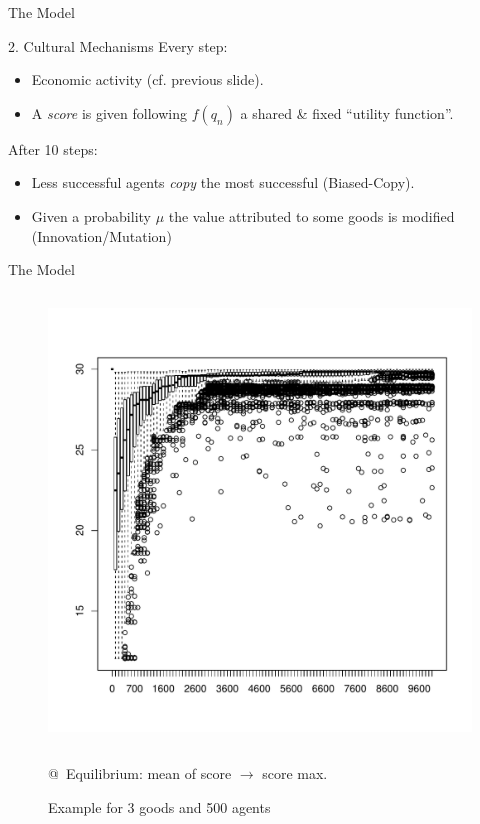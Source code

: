 \documentclass[12pt, handout=show,notes=show]{beamer}
\begin{document}
\begin{frame}{The Model}
	\begin{block}{2. Cultural Mechanisms}
	    Every step:
	    \begin{itemize}
		    \item Economic activity (cf. previous slide).
		    \item A \emph{score} is given following $f(q_n)$  a shared \& fixed ``utility function''.
	    \end{itemize}
		After 10 steps:
		\begin{itemize}
		    \item Less successful agents \emph{copy} the most successful (Biased-Copy).
		    \item Given a probability $\mu$ the value attributed to some goods is modified (Innovation/Mutation)
		\end{itemize}
	\end{block}
\end{frame}

\begin{frame}{The Model }
	\begin{figure}
	    \caption{Example for 3 goods and 500 agents}
	    \begin{columns}
		\includegraphics[height=\textwidth]{images/ScoreEvolutionForD-G3N500.pdf}\\
	    \end{columns}
		@~Equilibrium: mean of score  $\rightarrow$ score max.
	\end{figure}
	
\end{frame}
\end{document}
